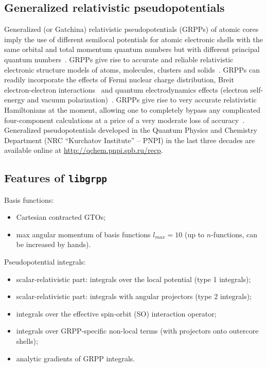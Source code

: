 \documentclass[12pt]{article}
\begin{document}
\subsection{Generalized relativistic pseudopotentials}
Generalized (or Gatchina) relativistic pseudopotentials (GRPPs) of atomic cores imply the use of different semilocal potentials for atomic electronic shells with the same orbital and total momentum quantum numbers but with different principal quantum numbers~\cite{Mosyagin:97,Titov:91,Titov:99}. GRPPs give rise to accurate and reliable relativistic electronic structure models of atoms, molecules, clusters and solids~\cite{Lomachuk:20,Maltsev:21,Shakhova:22}. GRPPs can readily incorporate the effects of Fermi nuclear charge distribution, Breit electron-electron interactions~\cite{Petrov:04,Mosyagin:06} and quantum electrodynamics effects (electron self-energy and vacuum polarization)~\cite{Shabaev:13,Zaitsevskii:QED:22}. GRPPs give rise to very accurate relativistic Hamiltonians at the moment, allowing one to completely bypass any complicated four-component calculations at a price of a very moderate loss of accuracy~\cite{Oleynichenko:LIBGRPP:23}. Generalized pseudopotentials developed in the Quantum Physics and Chemistry Department (NRC ``Kurchatov Institute'' -- PNPI) in the last three decades are available online at \url{http://qchem.pnpi.spb.ru/recp}.

\subsection{Features of \texttt{libgrpp}}

Basis functions:

\begin{itemize}
\item Cartesian contracted GTOs;
\item max angular momentum of basis functions $l_{max} = 10$ (up to $n$-functions, can be increased by hands).
\end{itemize}

\noindent
Pseudopotential integrals:

\begin{itemize}
\item scalar-relativistic part: integrals over the local potential (type 1 integrals);
\item scalar-relativistic part: integrals with angular projectors (type 2 integrals);
\item integrals over the effective spin-orbit (SO) interaction operator;
\item integrals over GRPP-specific non-local terms (with projectors onto outercore shells);
\item analytic gradients of GRPP integrals.
\end{itemize}
\end{document}

